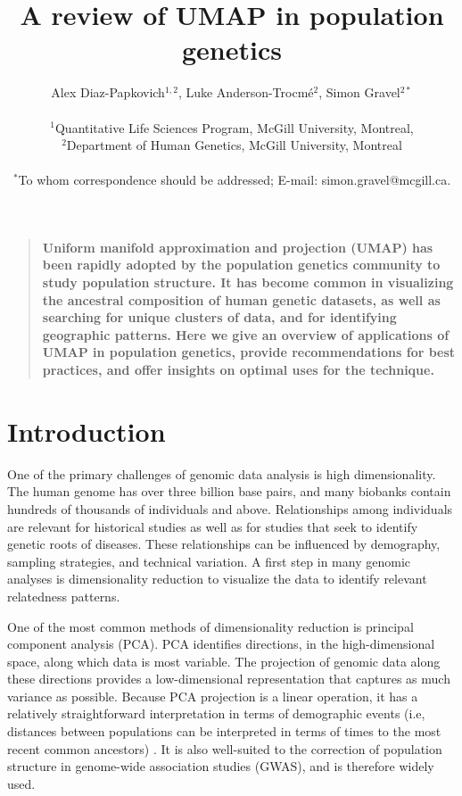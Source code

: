 \documentclass[12pt]{article}
\title{A review of UMAP in population genetics}
\author
{Alex Diaz-Papkovich$^{1,2}$, Luke Anderson-Trocm\'{e}$^{2}$, Simon Gravel$^{2\ast}$\\
\\
\normalsize{$^{1}$Quantitative Life Sciences Program, McGill University, Montreal,}\\
\normalsize{$^{2}$Department of Human Genetics, McGill University, Montreal}\\
\\
\normalsize{$^\ast$To whom correspondence should be addressed; E-mail:  simon.gravel@mcgill.ca.}
}
\date{}
\newenvironment{sciabstract}{%
\begin{quote} \bf}
{\end{quote}}
\begin{document}
 


\baselineskip24pt


\maketitle 



\begin{sciabstract}
Uniform manifold approximation and projection (UMAP) has been rapidly adopted by the population genetics community to study population structure. It has become common in visualizing the ancestral composition of human genetic datasets, as well as searching for unique clusters of data, and for identifying geographic patterns. Here we give an overview of applications of UMAP in population genetics, provide recommendations for best practices, and offer insights on optimal uses for the technique.
\end{sciabstract}

\section*{Introduction}
One of the primary challenges of genomic data analysis is high dimensionality. The human genome has over three billion base pairs, and many biobanks contain hundreds of thousands of individuals and above. Relationships among individuals are relevant for historical studies as well as for studies that seek to identify genetic roots of diseases. These relationships can be influenced by demography, sampling strategies, and technical variation. A first step in many genomic analyses is dimensionality reduction to visualize the data to identify relevant relatedness patterns. 

One of the most common methods of dimensionality reduction is principal component analysis (PCA). PCA identifies directions, in the high-dimensional space, along which data is most variable. The projection of genomic data along these directions provides a low-dimensional representation that captures as much variance as possible. Because PCA projection is a linear operation, it has a relatively straightforward interpretation in terms of demographic events (i.e, distances between populations can be interpreted in terms of times to the most recent common ancestors) \cite{mcvean2009genealogical}.  It is also well-suited to the correction of population structure in genome-wide association studies (GWAS)\cite{patterson2006population}, and is therefore widely used.
\end{document}
